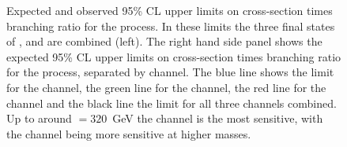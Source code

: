 \begin{figure}[h!]
\begin{center}
\caption{Expected and observed 95\% CL upper limits on cross-section times branching ratio
for the \Htohhtobbtautau process. In these limits the three final states of \etau, \mutau and \tautau are combined \cite{CMS-HIG-14-034} (left).
The right hand side panel shows the expected 95\% CL upper limits on cross-section times branching ratio for the \Htohhtobbtautau
process, separated by channel. The blue line shows the limit for the \tautau channel, the green line for the \mutau channel, the red line
for the \etau channel and the black line the limit for all three channels combined. Up to around \mH$= 320$~GeV the \mutau channel is the most
sensitive, with the \tautau channel being more sensitive at higher masses.}
\label{fig:hhh_results_modelindep}
\end{center}
\end{figure}



